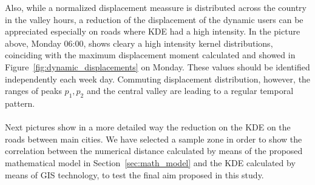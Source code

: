 Also, while a normalized displacement meassure is distributed across the country in the valley hours, a reduction of the displacement of the dynamic users can be appreciated especially on roads where KDE had a high intensity. In the picture above,  Monday 06:00, shows cleary a high intensity kernel distributions, coinciding with the maximum displacement moment calculated and showed in Figure~\ref{fig:dynamic_displacements} on Monday. These values should be identified independently each week day. Commuting displacement distribution, however, the ranges of peaks $p_1, p_2$ and the central valley are leading to a regular temporal pattern.
\\
\\
Next pictures show in a more detailed way the reduction on the KDE on the roads between main cities. We have selected a sample zone in order to show the correlation between the numerical distance calculated by means of the proposed mathematical model in Section~\ref{sec:math_model} and the KDE calculated by means of GIS technology, to test the final aim proposed in this study.
\newpage

